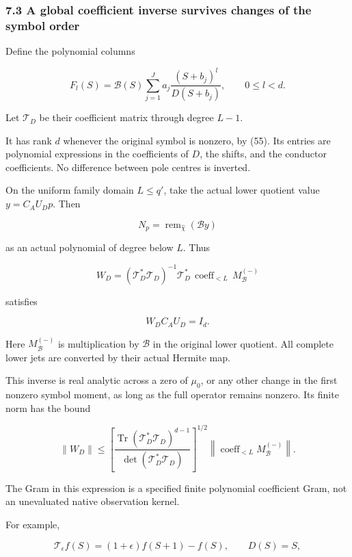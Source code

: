\documentclass[11pt]{article}
\begin{document}
\subsubsection{7.3 A global coefficient inverse survives changes of the symbol order}\label{a-global-coefficient-inverse-survives-changes-of-the-symbol-order}

Define the polynomial columns

\[
F_l(S)
=
\mathcal B(S)
\sum_{j=1}^{J}
a_j\frac{(S+b_j)^l}{D(S+b_j)},
\qquad 0\le l<d.
\]

Let \(\mathscr T_D\) be their coefficient matrix through degree \(L-1\).

It has rank \(d\) whenever the original symbol is nonzero, by (55). Its entries are polynomial expressions in the coefficients of \(D\), the shifts, and the conductor coefficients. No difference between pole centres is inverted.

On the uniform family domain \(L\le q'\), take the actual lower quotient value \(y=C_AU_Dp\). Then

\[
N_p=\operatorname{rem}_{\widehat\chi}(\mathcal B y)
\]

as an actual polynomial of degree below \(L\). Thus

\[
\boxed{
W_D
=
(\mathscr T_D^*\mathscr T_D)^{-1}\mathscr T_D^*
\,\operatorname{coeff}_{<L}
\,M_{\mathcal B}^{(-)}
}
\tag{58}
\]

satisfies

\[
\boxed{W_DC_AU_D=I_d.}
\tag{59}
\]

Here \(M_{\mathcal B}^{(-)}\) is multiplication by \(\mathcal B\) in the original lower quotient. All complete lower jets are converted by their actual Hermite map.

This inverse is real analytic across a zero of \(\mu_0\), or any other change in the first nonzero symbol moment, as long as the full operator remains nonzero. Its finite norm has the bound

\[
\boxed{
\|W_D\|
\le
\left[
\frac{
\operatorname{Tr}(\mathscr T_D^*\mathscr T_D)^{d-1}
}{
\det(\mathscr T_D^*\mathscr T_D)
}
\right]^{1/2}
\left\|\operatorname{coeff}_{<L}M_{\mathcal B}^{(-)}\right\|.
}
\tag{60}
\]

The Gram in this expression is a specified finite polynomial coefficient Gram, not an unevaluated native observation kernel.

For example,

\[
\mathcal T_\epsilon f(S)
=(1+\epsilon)f(S+1)-f(S),
\qquad D(S)=S,
\]
\end{document}
